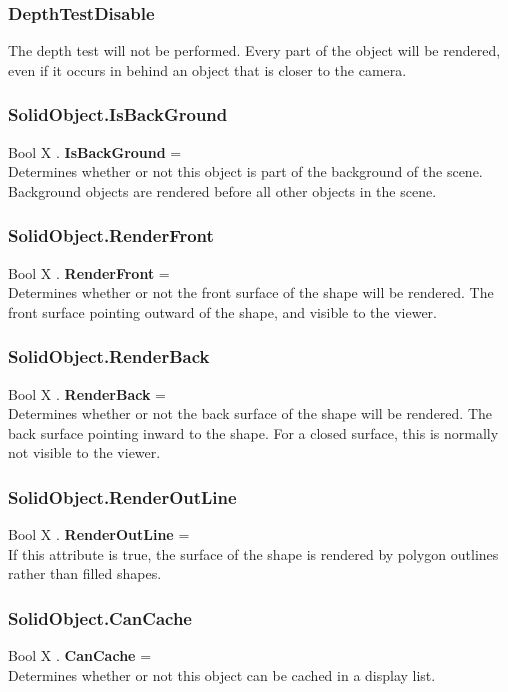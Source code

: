\subsubsection{DepthTestDisable \label{T:DepthTest|DepthTestDisable}}
The depth test will not be performed. Every part of the object will be rendered, even if it occurs in behind an object that is closer to the camera.

\subsubsection{SolidObject.IsBackGround \label{F:SolidObject:IsBackGround}}
Bool X . \textbf{IsBackGround} = \\
Determines whether or not this object is part of the background of the scene. Background objects are rendered before all other objects in the scene.

\subsubsection{SolidObject.RenderFront \label{F:SolidObject:RenderFront}}
Bool X . \textbf{RenderFront} = \\
Determines whether or not the front surface of the shape will be rendered. The front surface pointing outward of the shape, and visible to the viewer.

\subsubsection{SolidObject.RenderBack \label{F:SolidObject:RenderBack}}
Bool X . \textbf{RenderBack} = \\
Determines whether or not the back surface of the shape will be rendered. The back surface pointing inward to the shape. For a closed surface, this is normally not visible to the viewer.

\subsubsection{SolidObject.RenderOutLine \label{F:SolidObject:RenderOutLine}}
Bool X . \textbf{RenderOutLine} = \\
If this attribute is true, the surface of the shape is rendered by polygon outlines rather than filled shapes.

\subsubsection{SolidObject.CanCache \label{F:SolidObject:CanCache}}
Bool X . \textbf{CanCache} = \\
Determines whether or not this object can be cached in a display list.


